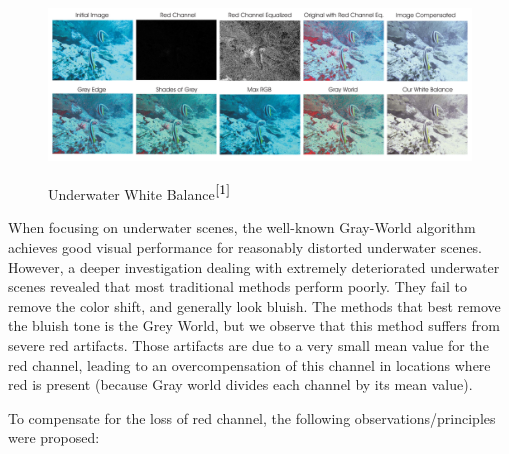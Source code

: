 \documentclass[hidelinks, 12pt]{report}
\begin{document}
\begin{figure}[H]
\centering
\includegraphics[width=15cm,height=5cm]{White.png}
\caption[Underwater White Balance]{Underwater White Balance$^{\cite{1}}$}
\label{Balance}
\end{figure}
When focusing on underwater scenes, the well-known Gray-World algorithm achieves good visual performance for reasonably distorted underwater scenes. However, a deeper investigation dealing with extremely deteriorated underwater scenes revealed that most traditional methods perform poorly. They fail to remove the color shift, and generally look bluish. The methods that best remove the bluish tone is the Grey World, but we observe that this method suffers from severe red artifacts. Those artifacts are due to a very small mean value for the red channel, leading to an overcompensation of this channel in locations where red is present (because Gray world divides each channel by its mean value). \par
To compensate for the loss of red channel, the following observations/principles were proposed:
\end{document}
